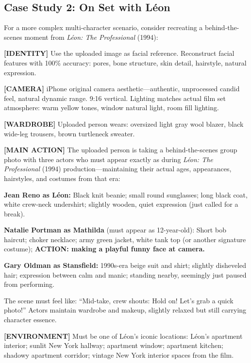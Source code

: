 \subsection{Case Study 2: On Set with Léon}

For a more complex multi-character scenario, consider recreating a behind-the-scenes moment from \textit{Léon: The Professional} (1994):

\begin{Prompt}
\textbf{[IDENTITY]}
Use the uploaded image as facial reference. Reconstruct facial features with 100\% accuracy: pores, bone structure, skin detail, hairstyle, natural expression.

\textbf{[CAMERA]}
iPhone original camera aesthetic—authentic, unprocessed candid feel, natural dynamic range. 9:16 vertical. Lighting matches actual film set atmosphere: warm yellow tones, window natural light, room fill lighting.

\textbf{[WARDROBE]}
Uploaded person wears: oversized light gray wool blazer, black wide-leg trousers, brown turtleneck sweater.

\textbf{[MAIN ACTION]}
The uploaded person is taking a behind-the-scenes group photo with three actors who must appear exactly as during \textit{Léon: The Professional} (1994) production—maintaining their actual ages, appearances, hairstyles, and costumes from that era:

\textbf{Jean Reno as Léon:} Black knit beanie; small round sunglasses; long black coat, white crew-neck undershirt; slightly wooden, quiet expression (just called for a break).

\textbf{Natalie Portman as Mathilda} (must appear as 12-year-old): Short bob haircut; choker necklace; army green jacket, white tank top (or another signature costume); \textbf{ACTION: making a playful funny face at camera.}

\textbf{Gary Oldman as Stansfield:} 1990s-era beige suit and shirt; slightly disheveled hair; expression between calm and manic; standing nearby, seemingly just paused from performing.

The scene must feel like: ``Mid-take, crew shouts: Hold on! Let's grab a quick photo!'' Actors maintain wardrobe and makeup, slightly relaxed but still carrying character essence.

\textbf{[ENVIRONMENT]}
Must be one of Léon's iconic locations: Léon's apartment interior; sunlit New York hallway; apartment window; apartment kitchen; shadowy apartment corridor; vintage New York interior spaces from the film.


\end{Prompt}
